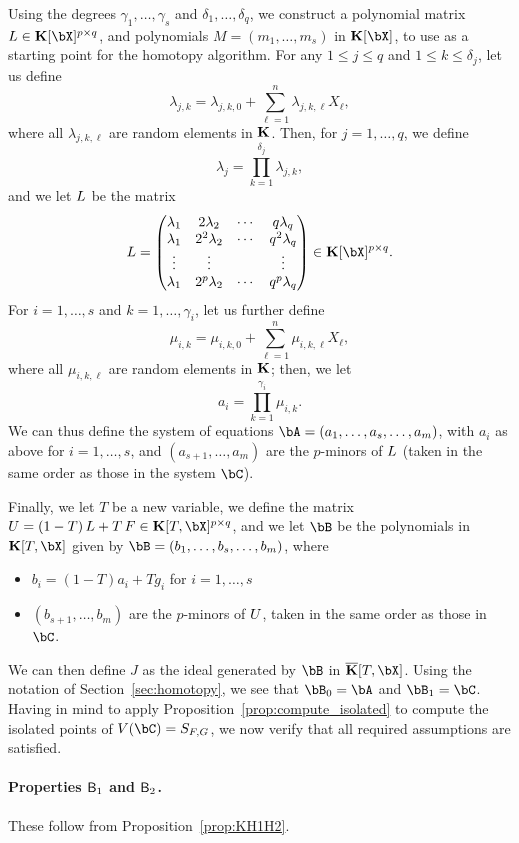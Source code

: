 \documentclass[12pt]{article}
\begin{document}
Using the degrees $\gamma_1,\dots,\gamma_s$ and  $\delta_1,\dots,\delta_q$, we construct a polynomial matrix $\mL \in
\KK[\bX]^{p \times q}$, and polynomials $M=(m_1,\dots,m_s)$ in
$\KK[\bX]$, to use as a starting point for the homotopy
algorithm. For any $1 \leq j \leq q$ and $1 \leq k \leq \delta_j$, let us
define $$\lambda_{j,k} = \lambda_{j,k,0} + \sum_{\ell = 1}^{n}\lambda_{j,k,\ell}X_\ell,$$ 
where all $\lambda_{j,k,\ell}$ are random elements in
$\mathbf{K}$. Then, for $j=1,\dots,q$, we define
$$\lambda_j = \prod_{k=1}^{\delta_j}\lambda_{j,k},$$
and we let  ${L}$ be the matrix
\[\mL = 
\left( \begin{matrix}
\lambda_1 & 2\lambda_2 & \cdots & q\lambda_{q}\\
\lambda_1 & 2^2\lambda_2 & \cdots & q^2\lambda_q\\
\vdots & \vdots &  & \vdots \\
\lambda_1 & 2^p\lambda_2 & \cdots & q^p\lambda_q
\end{matrix} \right) \in \KK[\bX]^{p\times q}.
\]
For $i=1,\dots,s$ and $k=1,\dots,\gamma_i$, let us further define
$$\mu_{i,k} =  \mu_{i,k,0} + \sum_{\ell = 1}^{n}\mu_{i,k,\ell}X_\ell,$$ where
all $\mu_{i,k,\ell}$ are random elements in $\mathbf{K}$; then, we let
$$a_i=\prod_{k=1}^{\gamma_i} \mu_{i,k}.$$ We can thus define the
system of equations $\bA=(a_1,\dots,a_s,\dots,a_m)$, with $a_i$ as
above for $i=1,\dots,s$, and $(a_{s+1},\dots,a_{m})$ are the
$p$-minors of ${L}$ (taken in the same order as those in the system
$\bC$).

Finally, we let $T$ be a new variable, we define the matrix
$\mU=(1-T)\, \mL + T \, \mF \in \KK[T,\bX]^{p\times q}$, and we let $\bB$ be the polynomials in
$\KK[T,\bX]$ given by $\bB=(b_1,\dots,b_s,\dots,b_m)$, where
\begin{itemize}
\item $b_i=(1-T) a_i + T g_i$ for $i=1,\dots,s$
\item $(b_{s+1},\dots,b_{m})$ are the $p$-minors of ${U}$, taken in
  the same order as those in $\bC$.
\end{itemize}
We can then define $J$ as the ideal generated by $\bB$ in
$\KKbar[T,\bX]$. Using the notation of Section~\ref{sec:homotopy}, we
see that $\bB_0=\bA$ and $\bB_1=\bC$. Having in mind
to apply Proposition~\ref{prop:compute_isolated} to compute the
isolated points of $V(\bC)=S_{\mF,\mG}$, we now verify that all
required assumptions are satisfied.

\paragraph{Properties $\mathsf{B}_1$ and $\mathsf{B}_2$.}
These follow from Proposition~\ref{prop:KH1H2}.
\end{document}
